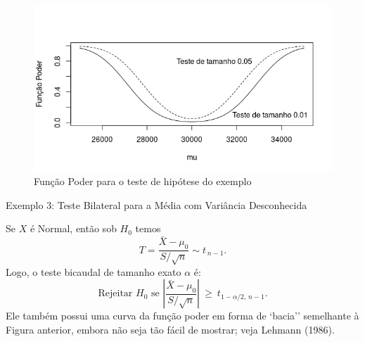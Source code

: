 \documentclass[12pt]{beamer}
\begin{document}
\begin{frame}{}
\begin{block}{}
\justifying
\begin{figure}
    \centering
    \includegraphics[scale=0.6]{figs/FunctionPower.png}
    \caption{Função Poder para o teste de hipótese do exemplo}
    \label{fig:enter-label}
\end{figure}
\end{block}
\end{frame}

\begin{frame}{Exemplo 3: Teste Bilateral para a Média com Variância Desconhecida}
	\begin{block}{}
		\justifying
		Se $X$ é Normal, então sob $H_0$ temos
		\[
		T=\frac{\bar X-\mu_0}{S/\sqrt{n}} \sim t_{\,n-1}.
		\]
		Logo, o teste bicaudal de tamanho exato $\alpha$ é:
		\[
		\text{Rejeitar } H_0 \text{ se } \left|\frac{\bar X-\mu_0}{S/\sqrt{n}}\right| \ \ge\ t_{1-\alpha/2,\,n-1}.
		\]
		Ele também possui uma curva da função poder em forma de `bacia'' semelhante à Figura anterior, embora não seja tão fácil de mostrar; veja Lehmann (1986).
	\end{block}
\end{frame}
\end{document}
